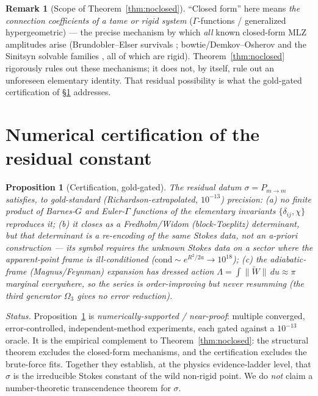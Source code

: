 \documentclass[11pt]{article}
\newtheorem{proposition}{Proposition}
\theoremstyle{definition}
\newtheorem{remark}{Remark}
\newcommand{\Pmid}{P_{m\to m}}
\begin{document}
\begin{remark}[Scope of Theorem~\ref{thm:noclosed}]
``Closed form'' here means \emph{the connection coefficients of a tame or rigid system} ($\Gamma$-functions
/ generalized hypergeometric) --- the precise mechanism by which \emph{all} known closed-form MLZ amplitudes
arise (Brundobler--Elser survivals \cite{BE}; bowtie/Demkov--Osherov and the Sinitsyn solvable families
\cite{Sinitsyn}, all of which are rigid). Theorem~\ref{thm:noclosed} rigorously rules out these mechanisms; it
does not, by itself, rule out an unforeseen elementary identity. That residual possibility is what the
gold-gated certification of \S\ref{sec:cert} addresses.
\end{remark}

\section{Numerical certification of the residual constant}\label{sec:cert}

\begin{proposition}[Certification, gold-gated]\label{prop:cert}
The residual datum $\sigma=\Pmid$ satisfies, to gold-standard (Richardson-extrapolated, $10^{-13}$)
precision: \emph{(a)} no finite product of Barnes-$G$ and Euler-$\Gamma$ functions of the elementary
invariants $\{\delta_{ij},\chi\}$ reproduces it; \emph{(b)} it closes as a Fredholm/Widom (block-Toeplitz)
determinant, but that determinant is a \emph{re-encoding} of the same Stokes data, not an a-priori
construction --- its symbol requires the unknown Stokes data on a sector where the apparent-point frame is
ill-conditioned ($\mathrm{cond}\sim e^{R^2/2a}\to10^{18}$); \emph{(c)} the adiabatic-frame (Magnus/Feynman)
expansion has dressed action $\Lambda=\int\|\widetilde W\|\,du\approx\pi$ \emph{marginal everywhere}, so the
series is order-improving but never resumming (the third generator $\Omega_3$ gives no error reduction).
\end{proposition}

\noindent\emph{Status.} Proposition~\ref{prop:cert} is \emph{numerically-supported / near-proof}:
multiple converged, error-controlled, independent-method experiments, each gated against a $10^{-13}$ oracle.
It is the empirical complement to Theorem~\ref{thm:noclosed}: the structural theorem excludes the closed-form
mechanisms, and the certification excludes the brute-force fits. Together they establish, at the physics
evidence-ladder level, that $\sigma$ is the irreducible Stokes constant of the wild non-rigid point. We do
\emph{not} claim a number-theoretic transcendence theorem for $\sigma$.
\end{document}
